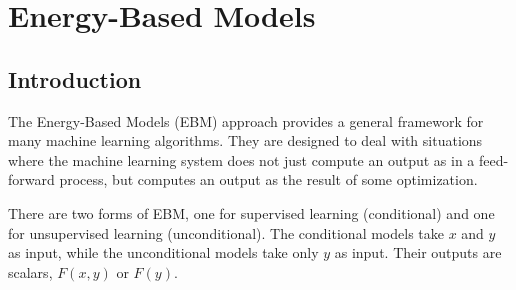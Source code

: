 \chapter{Energy-Based Models}

\section{Introduction}

The Energy-Based Models (EBM) approach provides a general framework for many machine learning algorithms. They are designed to deal with situations where the machine learning system does not just compute an output as in a feed-forward process, but computes an output as the result of some optimization.

There are two forms of EBM, one for supervised learning (conditional) and one for unsupervised learning (unconditional). The conditional models take $x$ and $y$ as input, while the unconditional models take only $y$ as input. Their outputs are scalars, $F(x,y)$ or $F(y)$.


